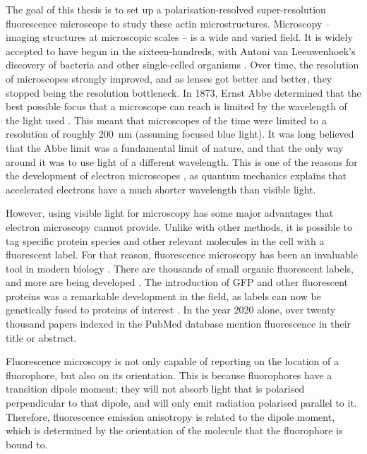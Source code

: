 The goal of this thesis is to set up a polarisation-resolved super-resolution fluorescence microscope to study these actin microstructures.	Microscopy -- imaging structures at microscopic scales -- is a wide and varied field. It is widely accepted to have begun in the sixteen-hundreds, with Antoni van Leeuwenhoek's discovery of bacteria and other single-celled organisms \cite{VanZuylen1981}. Over time, the resolution of microscopes strongly improved, and as lenses got better and better, they stopped being the resolution bottleneck. In 1873, Ernst Abbe determined that the best possible focus that a microscope can reach is limited by the wavelength of the light used \cite{Abbe1873}. This meant that microscopes of the time were limited to a resolution of roughly 200~nm (assuming focused blue light). It was long believed that the Abbe limit was a fundamental limit of nature, and that the only way around it was to use light of a different wavelength. This is one of the reasons for the development of electron microscopes \cite{Smith2008}, as quantum mechanics explains that accelerated electrons have a much shorter wavelength than visible light. 

However, using visible light for microscopy has some major advantages that electron microscopy cannot provide. Unlike with other methods, it is possible to tag specific protein species and other relevant molecules in the cell with a fluorescent label. For that reason, fluorescence microscopy has been an invaluable tool in modern biology \cite{Danial2016}.  There are thousands of small organic fluorescent labels, and more are being developed \cite{Zhang2002, Resch-Genger2008}. The introduction of GFP and other fluorescent proteins was a remarkable development in the field, as labels can now be genetically fused to proteins of interest \cite{Shaner2005, Matlashov2020}. In the year 2020 alone, over twenty thousand papers indexed in the PubMed database mention fluorescence in their title or abstract.

Fluorescence microscopy is not only capable of reporting on the location of a fluorophore, but also on its orientation. This is because fluorophores have a transition dipole moment; they will not absorb light that is polarised perpendicular to that dipole, and will only emit radiation polarised parallel to it. Therefore, fluorescence emission anisotropy is related to the dipole moment, which is determined by the orientation of the molecule that the fluorophore is bound to.

